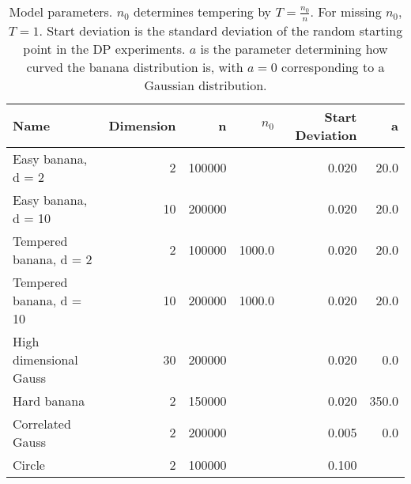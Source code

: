\begin{table}
\centering
\caption{
            Model parameters. $n_0$ determines tempering by \(T=\frac{n_0}{n}\).
            For missing $n_0$, \(T = 1\). Start deviation is the standard deviation
            of the random starting point in the DP experiments. \(a\) is the
            parameter determining how curved the banana distribution is,
            with \(a = 0\) corresponding to a Gaussian distribution.
            }
\label{model_params_table}
\begin{tabular}{lrrrrr}
\toprule
                    Name &  Dimension &       n &   $n_0$ &  Start Deviation &      a \\
\midrule
      Easy banana, d = 2 &          2 &  100000 &         &            0.020 &   20.0 \\
     Easy banana, d = 10 &         10 &  200000 &         &            0.020 &   20.0 \\
  Tempered banana, d = 2 &          2 &  100000 &  1000.0 &            0.020 &   20.0 \\
 Tempered banana, d = 10 &         10 &  200000 &  1000.0 &            0.020 &   20.0 \\
  High dimensional Gauss &         30 &  200000 &         &            0.020 &    0.0 \\
             Hard banana &          2 &  150000 &         &            0.020 &  350.0 \\
        Correlated Gauss &          2 &  200000 &         &            0.005 &    0.0 \\
                  Circle &          2 &  100000 &         &            0.100 &        \\
\bottomrule
\end{tabular}
\end{table}
